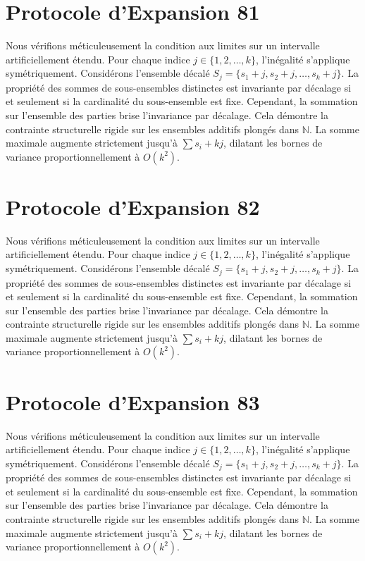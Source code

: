 \documentclass[12pt, a4paper, french]{article}
\theoremstyle{definition}
\begin{document}
\section{Protocole d'Expansion 81}
Nous vérifions méticuleusement la condition aux limites sur un intervalle artificiellement étendu. Pour chaque indice $j \in \{1, 2, \dots, k\}$, l'inégalité s'applique symétriquement. Considérons l'ensemble décalé $S_j = \{s_1 + j, s_2 + j, \dots, s_k + j\}$. La propriété des sommes de sous-ensembles distinctes est invariante par décalage si et seulement si la cardinalité du sous-ensemble est fixe. Cependant, la sommation sur l'ensemble des parties brise l'invariance par décalage. Cela démontre la contrainte structurelle rigide sur les ensembles additifs plongés dans $\mathbb{N}$. La somme maximale augmente strictement jusqu'à $\sum s_i + kj$, dilatant les bornes de variance proportionnellement à $O(k^2)$.

\section{Protocole d'Expansion 82}
Nous vérifions méticuleusement la condition aux limites sur un intervalle artificiellement étendu. Pour chaque indice $j \in \{1, 2, \dots, k\}$, l'inégalité s'applique symétriquement. Considérons l'ensemble décalé $S_j = \{s_1 + j, s_2 + j, \dots, s_k + j\}$. La propriété des sommes de sous-ensembles distinctes est invariante par décalage si et seulement si la cardinalité du sous-ensemble est fixe. Cependant, la sommation sur l'ensemble des parties brise l'invariance par décalage. Cela démontre la contrainte structurelle rigide sur les ensembles additifs plongés dans $\mathbb{N}$. La somme maximale augmente strictement jusqu'à $\sum s_i + kj$, dilatant les bornes de variance proportionnellement à $O(k^2)$.

\section{Protocole d'Expansion 83}
Nous vérifions méticuleusement la condition aux limites sur un intervalle artificiellement étendu. Pour chaque indice $j \in \{1, 2, \dots, k\}$, l'inégalité s'applique symétriquement. Considérons l'ensemble décalé $S_j = \{s_1 + j, s_2 + j, \dots, s_k + j\}$. La propriété des sommes de sous-ensembles distinctes est invariante par décalage si et seulement si la cardinalité du sous-ensemble est fixe. Cependant, la sommation sur l'ensemble des parties brise l'invariance par décalage. Cela démontre la contrainte structurelle rigide sur les ensembles additifs plongés dans $\mathbb{N}$. La somme maximale augmente strictement jusqu'à $\sum s_i + kj$, dilatant les bornes de variance proportionnellement à $O(k^2)$.
\end{document}
